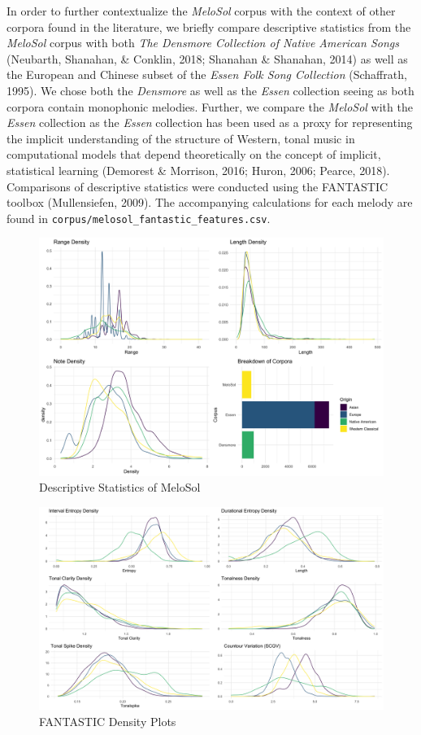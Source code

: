 \documentclass[english,man,floatsintext]{apa6}
\begin{document}
In order to further contextualize the \emph{MeloSol} corpus with the context of other corpora found in the literature, we briefly compare descriptive statistics from the \emph{MeloSol} corpus with both \emph{The Densmore Collection of Native American Songs} (Neubarth, Shanahan, \& Conklin, 2018; Shanahan \& Shanahan, 2014) as well as the European and Chinese subset of the \emph{Essen Folk Song Collection} (Schaffrath, 1995).
We chose both the \emph{Densmore} as well as the \emph{Essen} collection seeing as both corpora contain monophonic melodies.
Further, we compare the \emph{MeloSol} with the \emph{Essen} collection as the \emph{Essen} collection has been used as a proxy for representing the implicit understanding of the structure of Western, tonal music in computational models that depend theoretically on the concept of implicit, statistical learning (Demorest \& Morrison, 2016; Huron, 2006; Pearce, 2018).
Comparisons of descriptive statistics were conducted using the FANTASTIC toolbox (Mullensiefen, 2009).
The accompanying calculations for each melody are found in \texttt{corpus/melosol\_fantastic\_features.csv}.

\begin{figure}
\centering
\includegraphics{../img/comparative_descriptive_panel.png}
\caption{Descriptive Statistics of MeloSol}
\end{figure}

\begin{figure}
\centering
\includegraphics{../img/corpora_emergent.png}
\caption{FANTASTIC Density Plots}
\end{figure}
\end{document}
